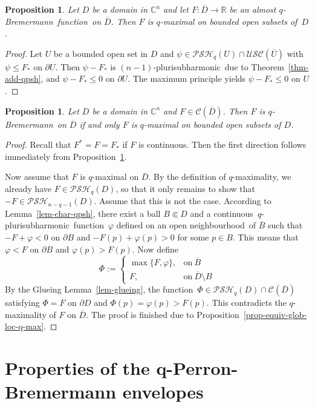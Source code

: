 \documentclass[10pt,a4paper]{amsart}
\newtheorem{prop}[thm]{Proposition}
\numberwithin{equation}{section}
\newcommand{\cbb}{\mathbb{C}}
\newcommand{\rbb}{\mathbb{R}}
\newcommand{\ccal}{\mathcal{C}}
\newcommand{\USC}{\mathcal{USC}}
\newcommand{\qbrem}{$q$-Bremermann}
\newcommand{\psh}{pluri\-sub\-harmonic}
\newcommand{\qpsh}{$q$-pluri\-sub\-harmonic}
\newcommand{\PSH}{\mathcal{PSH}}
\newcommand{\cl}[1]{\overline{#1}}
\newcommand{\nbh}{neighbourhood}
\newcommand{\cont}{continuous}
\newcommand{\fct}{function}
\newcommand{\cld}{\overline{D}}
\newcommand{\relc}{\Subset}
\begin{document}
\begin{prop}\label{prop-a-q-brem-implies-loc-q-max} Let $D$ be a domain in $\cbb^n$ and let $F:\cld\to\rbb$ be an almost \qbrem\ \fct\ on $\cld$. Then $F$ is $q$-maximal on bounded open subsets of~$D$.
\end{prop}

\begin{proof} Let $U$ be a bounded open set in $D$ and $\psi \in \PSH_q(U)\cap\USC(\cl{U})$ with $\psi \leq F_*$ on $\partial U$. Then $\psi-F_*$ is $(n-1)$-\psh\ due to Theorem~\ref{thm-add-qpsh}, and $\psi-F_* \leq 0$ on $\partial U$. The maximum principle yields $\psi-F_*\leq 0$ on $U$. 
\end{proof}


\begin{prop}\label{prop-equiv-loc-q-max-2} Let $D$ be a domain in $\cbb^n$ and $F\in\ccal(\cld)$. Then $F$ is \qbrem\ on $\cld$ if and only $F$ is $q$-maximal on bounded open subsets of $D$.
\end{prop}

\begin{proof} Recall that $F^*=F=F_*$ if $F$ is \cont. Then the first direction follows immediately from Proposition~\ref{prop-a-q-brem-implies-loc-q-max}.

Now assume that $F$ is $q$-maximal on $\cld$. By the definition of $q$-maximality, we already have $F \in \PSH_q(D)$, so that it only remains to show that $-F \in \PSH_{n-q-1}(D)$. Assume that this is not the case. According to Lemma~\ref{lem-char-qpsh}, there exist a ball $B \relc D$ and a \cont\ \qpsh\ \fct\ $\varphi$ defined on an open \nbh\ of $\cl{B}$ such that $-F+\varphi<0$ on $\partial B$ and $-F(p)+\varphi(p)>0$ for some $p \in B$. This means that $\varphi < F$ on $\partial B$ and $\varphi(p)>F(p)$. Now define
\[
\Phi:=\begin{cases} \max\{F,\varphi\}, & \text{on}\ \cl{B}\\ F, & \text{on}\ \cld\setminus B \end{cases}
\]
By the Glueing Lemma~\ref{lem-glueing}, the \fct\ $\Phi \in \PSH_q(D) \cap \ccal(\cld)$ satisfying $\Phi = F$ on $\partial D$ and $\Phi(p)=\varphi(p)>F(p)$. This contradicts the $q$-maximality of $F$ on $\cld$. The proof is finished due to Proposition~\ref{prop-equiv-glob-loc-q-max}.
\end{proof}






\section{Properties of the q-Perron-Bremermann envelopes}
\end{document}

